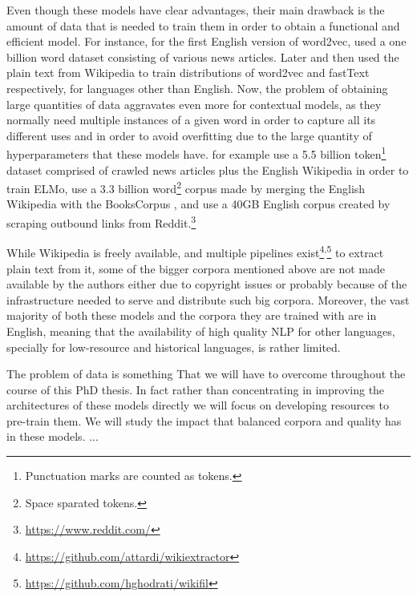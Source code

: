Even though these models have clear advantages, their main drawback is the amount of data that is needed to train them in order to obtain a functional and efficient model. For instance, for the first English version of word2vec, \citet{mikolov-etal-2013-distributed} used a one billion word dataset consisting of various news articles. Later \citet{al-rfou-etal-2013-polyglot} and then \citet{bojanowski-etal-2017-enriching} used the plain text from Wikipedia to train distributions of word2vec and fastText respectively, for languages other than English. Now, the problem of obtaining large quantities of data aggravates even more for contextual models, as they normally need multiple instances of a given word in order to capture all its different uses and in order to avoid overfitting due to the large quantity of hyperparameters that these models have. \citet{peters-etal-2018-deep} for example use a 5.5 billion token\footnote{Punctuation marks are counted as tokens.} dataset comprised of crawled news articles plus the English Wikipedia in order to train ELMo, \citet{devlin-etal-2019-bert} use a 3.3 billion word\footnote{Space sparated tokens.} corpus made by merging the English Wikipedia with the BooksCorpus \citep{zhu-etal-2015-aligning}, and \citet{radford-etal-2019-language} use a 40GB English corpus created by scraping outbound links from Reddit.\footnote{\url{https://www.reddit.com/}}

While Wikipedia is freely available, and multiple pipelines exist\footnote{\url{https://github.com/attardi/wikiextractor}}\textsuperscript{,}\footnote{\url{https://github.com/hghodrati/wikifil}} to extract plain text from it, some of the bigger corpora mentioned above are not made available by the authors either due to copyright issues or probably because of the infrastructure needed to serve and distribute such big corpora. Moreover, the vast majority of both these models and the corpora they are trained with are in English, meaning that the availability of high quality NLP for other languages, specially for low-resource and historical languages, is rather limited.


The problem of data is something That we will have to overcome throughout the course of this PhD thesis. In fact rather than concentrating in improving the architectures of these models directly we will focus on developing resources to pre-train them. We will study the impact that balanced corpora and quality has in these models. ...

